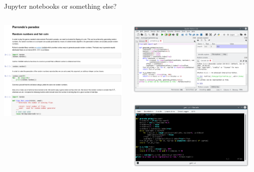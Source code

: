 \documentclass[svgnames]{beamer}
\begin{document}
\begin{frame}{Jupyter notebooks or something else?}
 \begin{columns}
  \begin{column}{0.6\textwidth}
   \includegraphics[width=\textwidth]{notebook}
  \end{column}%
  \begin{column}{0.4\textwidth}
   \includegraphics[width=\textwidth]{spyder}

   \includegraphics[width=\textwidth]{vim}
  \end{column}
 \end{columns}


\end{frame}
\end{document}
